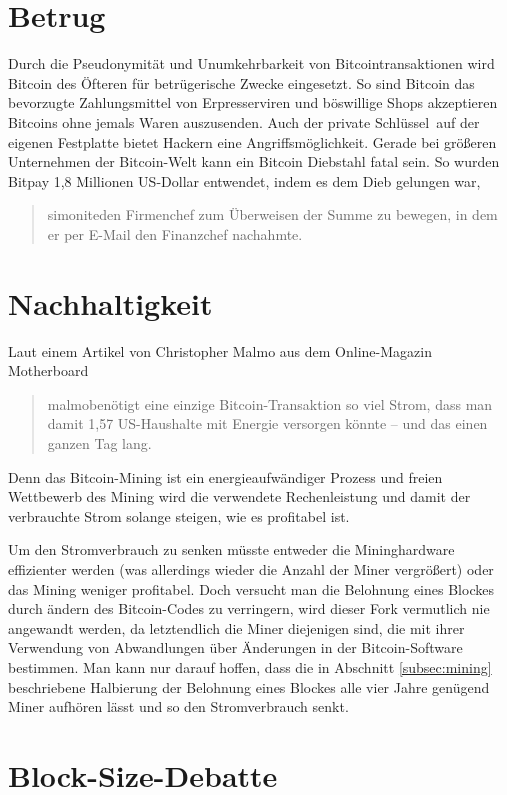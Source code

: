 \section{Betrug}

Durch die Pseudonymität und Unumkehrbarkeit von Bitcointransaktionen wird Bitcoin des Öfteren für betrügerische Zwecke eingesetzt.
So sind Bitcoin das bevorzugte Zahlungsmittel von Erpresserviren und böswillige Shops akzeptieren Bitcoins ohne jemals Waren auszusenden.
Auch der private Schlüssel auf der eigenen Festplatte bietet Hackern eine Angriffsmöglichkeit.
Gerade bei größeren Unternehmen der Bitcoin-Welt kann ein Bitcoin Diebstahl fatal sein.
So wurden Bitpay 1,8 Millionen US-Dollar entwendet, indem es dem Dieb gelungen war, \begin{quote}{simonite}den Firmenchef zum Überweisen der Summe zu bewegen, in dem er per E-Mail den Finanzchef nachahmte.\end{quote}

\section{Nachhaltigkeit}

Laut einem Artikel von Christopher Malmo aus dem Online-Magazin Motherboard \begin{quote}{malmo}benötigt eine einzige Bitcoin-Transaktion so viel Strom, dass man damit 1,57 US-Haushalte mit Energie versorgen könnte -- und das einen ganzen Tag lang.\end{quote}
Denn das Bitcoin-Mining ist ein energieaufwändiger Prozess und freien Wettbewerb des Mining wird die verwendete Rechenleistung und damit der verbrauchte Strom solange steigen, wie es profitabel ist.

Um den Stromverbrauch zu senken müsste entweder die Mininghardware effizienter werden (was allerdings wieder die Anzahl der Miner vergrößert) oder das Mining weniger profitabel.
Doch versucht man die Belohnung eines Blockes durch ändern des Bitcoin-Codes zu verringern, wird dieser Fork vermutlich nie angewandt werden, da letztendlich die Miner diejenigen sind, die mit ihrer Verwendung von Abwandlungen über Änderungen in der Bitcoin-Software bestimmen.
Man kann nur darauf hoffen, dass die in Abschnitt \ref{subsec:mining} beschriebene Halbierung der Belohnung eines Blockes alle vier Jahre genügend Miner aufhören lässt und so den Stromverbrauch senkt.

\section{Block-Size-Debatte}
\label{sec:blocksize}

